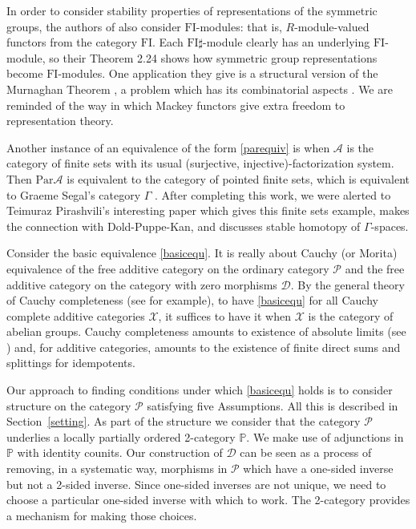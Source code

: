 \documentclass[a4paper,12pt,reqno]{amsart}
\theoremstyle{definition}
\theoremstyle{fact}
\theoremstyle{genquest}
\theoremstyle{step}
\def\CA{{\mathscr A}}
\def\CD{{\mathscr D}}
\def\CP{{\mathscr P}}
\def\CX{{\mathscr X}}
\begin{document}
In order to consider stability properties of representations of the symmetric groups, 
the authors of \cite{CEF2012} also consider $\mathrm{FI}$-modules: 
that is, $R$-module-valued functors from the category $\mathrm{FI}$. 
Each $\mathrm{FI}\sharp$-module
clearly has an underlying $\mathrm{FI}$-module, so their Theorem 2.24
shows how symmetric group representations become $\mathrm{FI}$-modules.
One application they give is a structural version of the Murnaghan Theorem
\cite{Mur38, Mur55}, a problem which has its combinatorial aspects \cite{Sta99}. 
We are reminded of the way in which Mackey functors
\cite{Lindner1976, PanSt} give extra freedom to representation theory.

Another instance of an equivalence of the form \eqref{parequiv} is when
$\CA$ is the category of finite sets with its usual (surjective, injective)-factorization
system. Then $\mathrm{Par}\CA$ is equivalent to the 
category of pointed finite sets,
which is equivalent to Graeme Segal's category $\Gamma$ \cite{Segal}. 
After completing this work, we were alerted to Teimuraz Pirashvili's interesting 
paper \cite{Pirash00} which gives this finite sets example, 
makes the connection with Dold-Puppe-Kan, and discusses stable homotopy of 
$\Gamma$-spaces.  

Consider the basic equivalence \eqref{basicequ}. It is really about Cauchy (or Morita)
equivalence of the free additive category on the ordinary category $\CP$
and the free additive category on the category with zero morphisms $\CD$. 
By the general theory of Cauchy completeness (see \cite{CCEC} for example),
to have \eqref{basicequ} for all Cauchy complete additive categories $\CX$, it
suffices to have it when $\CX$ is the category of abelian groups. 
Cauchy completeness amounts to existence of absolute limits (see \cite{ACEC})
and, for additive categories,
amounts to the existence of finite direct sums and splittings for idempotents.

Our approach to finding conditions under which \eqref{basicequ} holds 
is to consider structure on the category $\CP$
satisfying five Assumptions. All this is described in Section~\ref{setting}. 
As part of the structure we consider that the category $\CP$
underlies a locally partially ordered 2-category $\mathbb{P}$.
We make use of adjunctions in $\mathbb{P}$ with identity counits.  
Our construction of $\CD$ can be seen as a process of removing, 
in a systematic way, morphisms in $\CP$ which have a one-sided inverse but not a 2-sided inverse.  
Since one-sided inverses are not unique, 
we need to choose a particular one-sided inverse with which to work. 
The 2-category provides a mechanism for making those choices.
\end{document}
